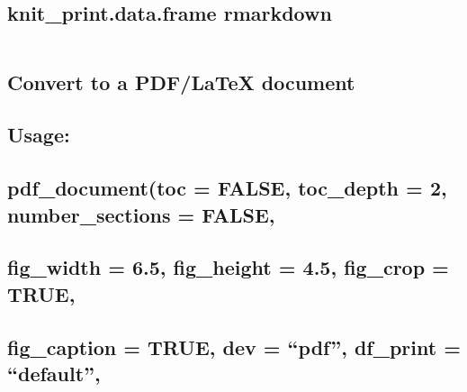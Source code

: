 \documentclass[]{article}
\begin{document}
\hypertarget{knit_print.data.frame-rmarkdown}{%
\subsection{knit\_print.data.frame
rmarkdown}\label{knit_print.data.frame-rmarkdown}}

\begin{verbatim}
\end{verbatim}

\hypertarget{convert-to-a-pdflatex-document}{%
\subsection{Convert to a PDF/LaTeX
document}\label{convert-to-a-pdflatex-document}}

\hypertarget{section}{%
\subsection{}\label{section}}

\hypertarget{usage}{%
\subsection{Usage:}\label{usage}}

\hypertarget{section-1}{%
\subsection{}\label{section-1}}

\hypertarget{pdf_documenttoc-false-toc_depth-2-number_sections-false}{%
\subsection{pdf\_document(toc = FALSE, toc\_depth = 2, number\_sections
=
FALSE,}\label{pdf_documenttoc-false-toc_depth-2-number_sections-false}}

\hypertarget{fig_width-6.5-fig_height-4.5-fig_crop-true}{%
\subsection{fig\_width = 6.5, fig\_height = 4.5, fig\_crop =
TRUE,}\label{fig_width-6.5-fig_height-4.5-fig_crop-true}}

\hypertarget{fig_caption-true-dev-pdf-df_print-default}{%
\subsection{fig\_caption = TRUE, dev = ``pdf'', df\_print =
``default'',}\label{fig_caption-true-dev-pdf-df_print-default}}
\end{document}
